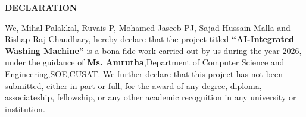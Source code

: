\clearpage
{}
{}
\thispagestyle{footeronly}
\begin{center}
{\Large \textbf{DECLARATION}}
\end{center}

\justifying
\noindent
We, Mihal Palakkal, Ruvais P, Mohamed Jaseeb PJ, 
Sajad Hussain Malla and Rishap Raj Chaudhary, hereby declare that the project titled 
\textbf{``AI-Integrated Washing Machine''} 
is a bona fide work carried out by us during the year 2026, 
under the guidance of \textbf{Ms. Amrutha},Department of Computer Science and Engineering,SOE,CUSAT. 
We further declare that this project has not been submitted, 
either in part or full, for the award of any degree, diploma, 
associateship, fellowship, or any other academic recognition 
in any university or institution.

\vfill

\clearpage